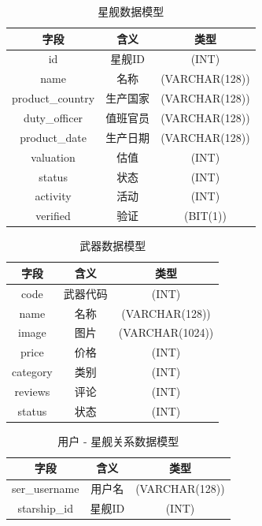 \documentclass{base}
\begin{document}
\begin{table}[H]
	\centering
	\caption{星舰数据模型}
	\begin{tabular}{@{}ccc@{}}
		\toprule
		字段               & 含义   & 类型             \\ \midrule
		id               & 星舰ID & (INT)          \\
		name             & 名称   & (VARCHAR(128)) \\
		product\_country & 生产国家 & (VARCHAR(128)) \\
		duty\_officer    & 值班官员 & (VARCHAR(128)) \\
		product\_date    & 生产日期 & (VARCHAR(128)) \\
		valuation        & 估值   & (INT)          \\
		status           & 状态   & (INT)          \\
		activity         & 活动   & (INT)          \\
		verified         & 验证   & (BIT(1))      \\ \bottomrule
	\end{tabular}
\end{table}


\begin{table}[H]
		\centering
	\caption{武器数据模型}
	\begin{tabular}{@{}ccc@{}}
		\toprule
		字段       & 含义   & 类型              \\ \midrule
		code     & 武器代码 & (INT)           \\
		name     & 名称   & (VARCHAR(128))  \\
		image    & 图片   & (VARCHAR(1024)) \\
		price    & 价格   & (INT)           \\
		category & 类别   & (INT)           \\
		reviews  & 评论   & (INT)           \\
		status   & 状态   & (INT)           \\ \bottomrule
	\end{tabular}
\end{table}

\begin{table}[H]
			\centering
	\caption{用户 - 星舰关系数据模型}
	\begin{tabular}{@{}ccc@{}}
		\toprule
		字段            & 含义   & 类型             \\ \midrule
		ser\_username & 用户名  & (VARCHAR(128)) \\
		starship\_id  & 星舰ID & (INT)          \\ \bottomrule
	\end{tabular}
\end{table}
\end{document}
